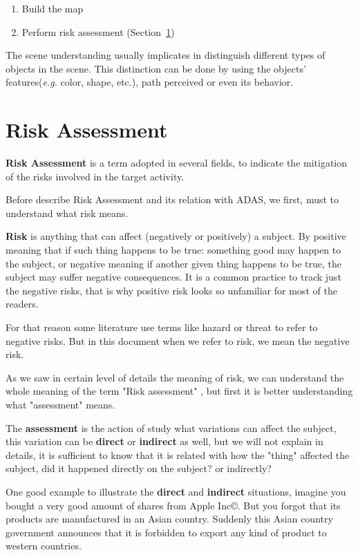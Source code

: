 \begin{enumerate}
\item Build the map
\item Perform risk assessment (Section~\ref{sec:riskassessment})
\end{enumerate}

The scene understanding usually implicates in distinguish different types of objects in the scene. This distinction can be done by using the objects' features(\textit{e.g.} color, shape, etc.), path perceived or even its behavior. 


\section{Risk Assessment}
\label{sec:riskassessment}

\textbf{Risk Assessment} is a term adopted in several fields, to indicate the mitigation of the risks involved in the target activity. 

Before describe Risk Assessment and its relation with ADAS, we first, must to understand what risk means.

\textbf{Risk} is anything that can affect (negatively or positively) a subject. By positive meaning that if such thing happens to be true: something good may happen to the subject, or negative meaning if another given thing happens to be true, the subject may suffer negative consequences. It is a common practice to track just the negative risks, that is why positive risk looks so unfamiliar for most of the readers. 

For that reason some literature use terms like hazard or threat to refer to negative risks. But in this document when we refer to risk, we mean the negative risk.

As we saw in certain level of details the meaning of risk, we can understand the whole meaning of the term "Risk assessment" , but first it is better understanding what "assessment" means.

The \textbf{assessment} is the action of study what variations can affect the subject, this variation can be \textbf{direct} or \textbf{indirect} as well, but we will not explain in details, it is sufficient to know that it is related with how the "thing" affected the subject, did it happened directly on the subject? or indirectly?

One good example to illustrate the \textbf{direct} and \textbf{indirect} situations, imagine you bought a very good amount of shares from Apple Inc\copyright. But you forgot that its products are manufactured in an Asian country. Suddenly this Asian country government announces that it is forbidden to export any kind of product to western countries. 

